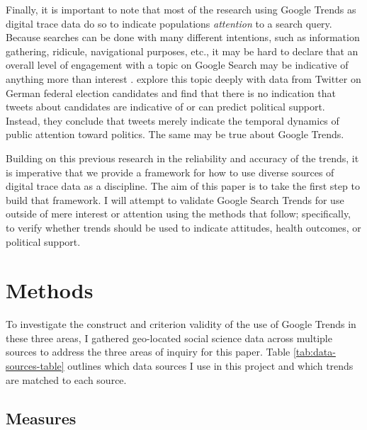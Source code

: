 Finally, it is important to note that most of the research using 
Google Trends as digital trace data do so to indicate
populations \textit{attention} to a search query. Because
searches can be done with many different intentions, such as 
information gathering, ridicule, navigational purposes, etc., it may
be hard to declare that an overall level of engagement with a topic
on Google Search may be indicative of anything more than interest \citep{da2011search}. 
\citet{jungherr_etal17} explore this topic deeply with data from
Twitter on German federal election candidates and find that there is no
indication that tweets about candidates are indicative of or can predict 
political support. Instead, they conclude that tweets merely indicate the
temporal dynamics of public attention toward politics. The same may
be true about Google Trends. 

Building on this previous research in the reliability and accuracy of the trends, 
it is imperative that we provide a framework for how to use diverse sources
of digital trace data as a discipline. The aim of this paper is
to take the first step to build that framework. I will attempt to validate 
Google Search Trends for use outside of mere interest or attention using the
methods that follow; specifically, to verify whether
trends should be used to indicate attitudes, health outcomes, or political support. 

\section{Methods}
To investigate the construct and criterion validity of the use of Google Trends
in these three areas, I gathered geo-located social science data across multiple
sources to address the three areas of inquiry for this paper.  Table
\ref{tab:data-sources-table} outlines which data sources I use in this
project and which trends are matched to each source.



\subsection{Measures}


